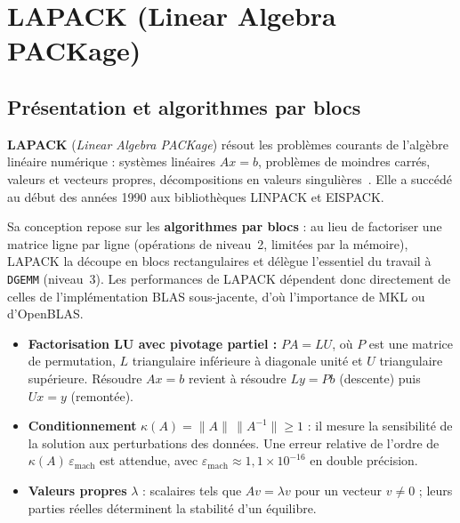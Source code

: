 \documentclass[11pt,a4paper]{report}
\theoremstyle{plain}
\theoremstyle{definition}
\theoremstyle{remark}
\begin{document}
\chapter{LAPACK (Linear Algebra PACKage)}

\section{Présentation et algorithmes par blocs}

\textbf{LAPACK} (\textit{Linear Algebra PACKage}) résout les problèmes courants de l'algèbre linéaire numérique : systèmes linéaires $Ax=b$, problèmes de moindres carrés, valeurs et vecteurs propres, décompositions en valeurs singulières~\cite{lapack1999}. Elle a succédé au début des années 1990 aux bibliothèques LINPACK et EISPACK.

Sa conception repose sur les \textbf{algorithmes par blocs} : au lieu de factoriser une matrice ligne par ligne (opérations de niveau~2, limitées par la mémoire), LAPACK la découpe en blocs rectangulaires et délègue l'essentiel du travail à \texttt{DGEMM} (niveau~3). Les performances de LAPACK dépendent donc directement de celles de l'implémentation BLAS sous-jacente, d'où l'importance de MKL ou d'OpenBLAS.

\begin{cadreconcept}
\begin{itemize}
    \item \textbf{Factorisation LU avec pivotage partiel :} $PA = LU$, où $P$ est une matrice de permutation, $L$ triangulaire inférieure à diagonale unité et $U$ triangulaire supérieure. Résoudre $Ax=b$ revient à résoudre $Ly=Pb$ (descente) puis $Ux=y$ (remontée).
    \item \textbf{Conditionnement} $\kappa(A)=\|A\|\,\|A^{-1}\|\ge 1$ : il mesure la sensibilité de la solution aux perturbations des données. Une erreur relative de l'ordre de $\kappa(A)\,\varepsilon_{\mathrm{mach}}$ est attendue, avec $\varepsilon_{\mathrm{mach}}\approx 1{,}1\times10^{-16}$ en double précision.
    \item \textbf{Valeurs propres} $\lambda$ : scalaires tels que $Av=\lambda v$ pour un vecteur $v\ne0$ ; leurs parties réelles déterminent la stabilité d'un équilibre.
\end{itemize}
\end{cadreconcept}
\end{document}
